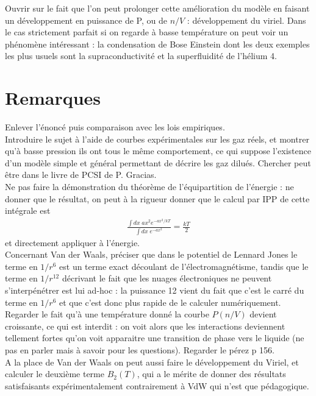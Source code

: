 \documentclass[12pt,prb,aps,epsf]{article}
\begin{document}
Ouvrir sur le fait que l'on peut prolonger cette amélioration du modèle en faisant un développement en puissance de P, ou de $n/V$ : développement du viriel. Dans le cas strictement parfait si on regarde à basse température on peut voir un phénomène intéressant : la condensation de Bose Einstein dont les deux exemples les plus usuels sont la supraconductivité et la superfluidité de l'hélium 4.

\section*{Remarques}
Enlever l'énoncé puis comparaison avec les lois empiriques.\\

Introduire le sujet à l'aide de courbes expérimentales sur les gaz réels, et montrer qu'à basse pression ils ont tous le même comportement, ce qui suppose l'existence d'un modèle simple et général permettant de décrire les gaz dilués. Chercher peut être dans le livre de PCSI de P. Gracias.\\

Ne pas faire la démonstration du théorème de l'équipartition de l'énergie : ne donner que le résultat, on peut à la rigueur donner que le calcul par IPP de cette intégrale est 
\begin{eqnarray}
\frac{\int dx\;a x^2 e^{-ax^2/kT}}{\int dx\; e^{-ax^2}} = \frac{kT}{2}
\end{eqnarray}
et directement appliquer à l'énergie.\\

Concernant Van der Waals, préciser que dans le potentiel de Lennard Jones le terme en $1/r^6$ est un terme exact découlant de l'électromagnétisme, tandis que le terme en $1/r^{12}$ décrivant le fait que les nuages électroniques ne peuvent s'interpénétrer est lui ad-hoc : la puissance 12 vient du fait que c'est le carré du terme en $1/r^6$ et que c'est donc plus rapide de le calculer numériquement.\\

Regarder le fait qu'à une température donné la courbe $P(n/V)$ devient croissante, ce qui est interdit : on voit alors que les interactions deviennent tellement fortes qu'on voit apparaitre une transition de phase vers le liquide (ne pas en parler mais à savoir pour les questions). Regarder le pérez p 156.\\

A la place de Van der Waals on peut aussi faire le développement du Viriel, et calculer le deuxième terme $B_2(T)$, qui a le mérite de donner des résultats satisfaisants expérimentalement contrairement à VdW qui n'est que pédagogique.
	
\end{document}
